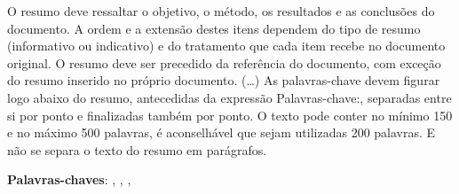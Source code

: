 \begin{resumo}
 O resumo deve ressaltar o objetivo, o método, os resultados e as conclusões
 do documento. A ordem e a extensão
 destes itens dependem do tipo de resumo (informativo ou indicativo) e do
 tratamento que cada item recebe no documento original. O resumo deve ser
 precedido da referência do documento, com exceção do resumo inserido no
 próprio documento. (\ldots) As palavras-chave devem figurar logo abaixo do
 resumo, antecedidas da expressão Palavras-chave:, separadas entre si por
 ponto e finalizadas também por ponto. O texto pode conter no mínimo 150 e
 no máximo 500 palavras, é aconselhável que sejam utilizadas 200 palavras.
 E não se separa o texto do resumo em parágrafos.

 \vspace{\onelineskip}

 \noindent
 \textbf{Palavras-chaves}: \imprimirpalavrachaveum, \imprimirpalavrachavedois, \imprimirpalavrachavetres, \imprimirpalavrachavequatro
\end{resumo}
